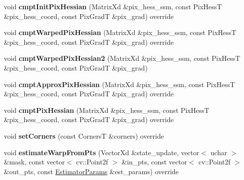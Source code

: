 \begin{DoxyCompactItemize}
\item 
\hypertarget{classHomography_ab4f2300c1e237780a8f9e1785852517c}{void {\bfseries cmpt\-Init\-Pix\-Hessian} (Matrix\-Xd \&pix\-\_\-hess\-\_\-ssm, const Pix\-Hess\-T \&pix\-\_\-hess\-\_\-coord, const Pix\-Grad\-T \&pix\-\_\-grad) override}\label{classHomography_ab4f2300c1e237780a8f9e1785852517c}

\item 
\hypertarget{classHomography_ad6570e3980f5cc70afbbd27876f2a143}{void {\bfseries cmpt\-Warped\-Pix\-Hessian} (Matrix\-Xd \&pix\-\_\-hess\-\_\-ssm, const Pix\-Hess\-T \&pix\-\_\-hess\-\_\-coord, const Pix\-Grad\-T \&pix\-\_\-grad) override}\label{classHomography_ad6570e3980f5cc70afbbd27876f2a143}

\item 
\hypertarget{classHomography_ace274d1aa99394ec58cfe1a5ce52b4ef}{void {\bfseries cmpt\-Warped\-Pix\-Hessian2} (Matrix\-Xd \&pix\-\_\-hess\-\_\-ssm, const Pix\-Hess\-T \&pix\-\_\-hess\-\_\-coord, const Pix\-Grad\-T \&pix\-\_\-grad)}\label{classHomography_ace274d1aa99394ec58cfe1a5ce52b4ef}

\item 
\hypertarget{classHomography_a6fcec5bbdcdbb2956f3c42737831b135}{void {\bfseries cmpt\-Approx\-Pix\-Hessian} (Matrix\-Xd \&pix\-\_\-hess\-\_\-ssm, const Pix\-Hess\-T \&pix\-\_\-hess\-\_\-coord, const Pix\-Grad\-T \&pix\-\_\-grad) override}\label{classHomography_a6fcec5bbdcdbb2956f3c42737831b135}

\item 
\hypertarget{classHomography_ad04a9cbfcf02e00a1f400362f303304b}{void {\bfseries cmpt\-Pix\-Hessian} (Matrix\-Xd \&pix\-\_\-hess\-\_\-ssm, const Pix\-Hess\-T \&pix\-\_\-hess\-\_\-coord, const Pix\-Grad\-T \&pix\-\_\-grad) override}\label{classHomography_ad04a9cbfcf02e00a1f400362f303304b}

\item 
\hypertarget{classHomography_a1ef519ad1bbb68e0e050077cd637e98a}{void {\bfseries set\-Corners} (const Corners\-T \&corners) override}\label{classHomography_a1ef519ad1bbb68e0e050077cd637e98a}

\item 
\hypertarget{classHomography_aeda35457c9698e9274fc8917598ceb0c}{void {\bfseries estimate\-Warp\-From\-Pts} (Vector\-Xd \&state\-\_\-update, vector$<$ uchar $>$ \&mask, const vector$<$ cv\-::\-Point2f $>$ \&in\-\_\-pts, const vector$<$ cv\-::\-Point2f $>$ \&out\-\_\-pts, const \hyperlink{structSSMEstimatorParams}{Estimator\-Params} \&est\-\_\-params) override}\label{classHomography_aeda35457c9698e9274fc8917598ceb0c}


\end{DoxyCompactItemize}
